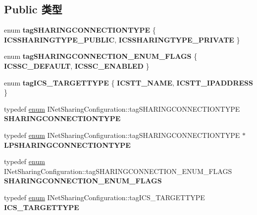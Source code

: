 \subsection*{Public 类型}
\begin{DoxyCompactItemize}
\item 
\mbox{\label{interface_i_net_sharing_configuration_aa8185ab9b180a2e61352a84135d70a69}} 
enum {\bfseries tag\+S\+H\+A\+R\+I\+N\+G\+C\+O\+N\+N\+E\+C\+T\+I\+O\+N\+T\+Y\+PE} \{ {\bfseries I\+C\+S\+S\+H\+A\+R\+I\+N\+G\+T\+Y\+P\+E\+\_\+\+P\+U\+B\+L\+IC}, 
{\bfseries I\+C\+S\+S\+H\+A\+R\+I\+N\+G\+T\+Y\+P\+E\+\_\+\+P\+R\+I\+V\+A\+TE}
 \}
\item 
\mbox{\label{interface_i_net_sharing_configuration_ab7b01335b6f0e66a7f221d70511ef70f}} 
enum {\bfseries tag\+S\+H\+A\+R\+I\+N\+G\+C\+O\+N\+N\+E\+C\+T\+I\+O\+N\+\_\+\+E\+N\+U\+M\+\_\+\+F\+L\+A\+GS} \{ {\bfseries I\+C\+S\+S\+C\+\_\+\+D\+E\+F\+A\+U\+LT}, 
{\bfseries I\+C\+S\+S\+C\+\_\+\+E\+N\+A\+B\+L\+ED}
 \}
\item 
\mbox{\label{interface_i_net_sharing_configuration_adc66f1e7dca24f31b4b5ac18e783b177}} 
enum {\bfseries tag\+I\+C\+S\+\_\+\+T\+A\+R\+G\+E\+T\+T\+Y\+PE} \{ {\bfseries I\+C\+S\+T\+T\+\_\+\+N\+A\+ME}, 
{\bfseries I\+C\+S\+T\+T\+\_\+\+I\+P\+A\+D\+D\+R\+E\+SS}
 \}
\item 
\mbox{\label{interface_i_net_sharing_configuration_a91d89133288f5f49255c2a66b4ae42b3}} 
typedef \hyperlink{interfaceenum}{enum} I\+Net\+Sharing\+Configuration\+::tag\+S\+H\+A\+R\+I\+N\+G\+C\+O\+N\+N\+E\+C\+T\+I\+O\+N\+T\+Y\+PE {\bfseries S\+H\+A\+R\+I\+N\+G\+C\+O\+N\+N\+E\+C\+T\+I\+O\+N\+T\+Y\+PE}
\item 
\mbox{\label{interface_i_net_sharing_configuration_a46c12053647683772abc37044d7e78bc}} 
typedef \hyperlink{interfaceenum}{enum} I\+Net\+Sharing\+Configuration\+::tag\+S\+H\+A\+R\+I\+N\+G\+C\+O\+N\+N\+E\+C\+T\+I\+O\+N\+T\+Y\+PE $\ast$ {\bfseries L\+P\+S\+H\+A\+R\+I\+N\+G\+C\+O\+N\+N\+E\+C\+T\+I\+O\+N\+T\+Y\+PE}
\item 
\mbox{\label{interface_i_net_sharing_configuration_af892c9f7d46eee13048627e26cab65f7}} 
typedef \hyperlink{interfaceenum}{enum} I\+Net\+Sharing\+Configuration\+::tag\+S\+H\+A\+R\+I\+N\+G\+C\+O\+N\+N\+E\+C\+T\+I\+O\+N\+\_\+\+E\+N\+U\+M\+\_\+\+F\+L\+A\+GS {\bfseries S\+H\+A\+R\+I\+N\+G\+C\+O\+N\+N\+E\+C\+T\+I\+O\+N\+\_\+\+E\+N\+U\+M\+\_\+\+F\+L\+A\+GS}
\item 
\mbox{\label{interface_i_net_sharing_configuration_a639206e1bf5d3f15a9c3b3c141f70356}} 
typedef \hyperlink{interfaceenum}{enum} I\+Net\+Sharing\+Configuration\+::tag\+I\+C\+S\+\_\+\+T\+A\+R\+G\+E\+T\+T\+Y\+PE {\bfseries I\+C\+S\+\_\+\+T\+A\+R\+G\+E\+T\+T\+Y\+PE}
\end{DoxyCompactItemize}
